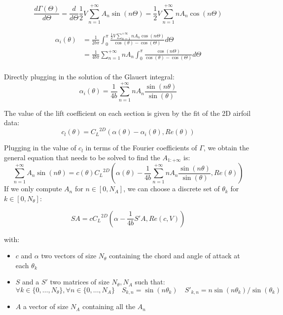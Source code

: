 \documentclass[letterpaper,12pt]{article}
\begin{document}
$$\frac{d\Gamma(\Theta)}{d\Theta} = \frac{d}{d\Theta}\frac12 V\sum_{n=1}^{+\infty} A_n \sin(n\Theta)  = \frac{1}{2} V\sum_{n=1}^{+\infty} n A_n \cos(n\Theta) $$

\begin{align*}
	\alpha_i(\theta) &= \frac{1}{2b\pi }  \int_{0}^{\pi} \frac{ \frac{1}{2} V\sum_{n=1}^{+\infty} n A_n \cos(n\Theta) }{\cos(\theta)-\cos(\Theta)} d\Theta	\\
				&= \frac{1}{4b\pi }  \sum_{n=1}^{+\infty} n A_n \int_{0}^{\pi} \frac{ \cos(n\Theta) }{\cos(\theta)-\cos(\Theta)} d\Theta	\\
\end{align*}

Directly plugging in the solution of the Glauert integral:
$$ \alpha_i(\theta) = \frac {1}{4b}  \sum_{n=1}^{+\infty} n A_n \frac{ \sin(n\theta) }{\sin(\theta)} 	$$

The value of the lift coefficient on each section is given by the fit of the 2D airfoil data:
$$c_l(\theta) = {C_L}^{2D} \left( \alpha(\theta) - \alpha_i(\theta), Re(\theta)\right)$$

Plugging in the value of $c_l$ in terms of the Fourier coefficients of $\Gamma$,
we obtain the general equation that needs to be solved to find the $A_{1:+\infty}$ is:
%
$$
\sum_{n=1}^{+\infty} A_n \sin(n\theta) = c(\theta) {C_L}^{2D} \left( \alpha(\theta) - \frac {1}{4b}  \sum_{n=1}^{+\infty} n A_n \frac{ \sin(n\theta) }{\sin(\theta)} , Re(\theta)\right)
$$
%
If we only compute $A_{n}$ for $n \in [0, N_A]$, we can choose a discrete set of $\theta_k$ for $k \in [0, N_{\theta}]$:

\begin{equation}
	SA = c {C_L}^{2D} \left( \alpha - \frac {1}{4b} S' A , Re(c, V)\right) 
\end{equation}

with:
\begin{itemize}
	\item[] $c$ and $\alpha$ two vectors of size $N_{\theta}$ containing the chord and angle of attack at each $\theta_k$
	\item[] $S$ and a $S'$ two matrices of size $N_{\theta}, N_A$ such that: 
	$$ \forall k\in \{0,\dots, N_{\theta}\}, \forall n \in \{0,\dots, N_A\} \quad S_{k,n} = \sin(n\theta_k) \quad {S'}_{k,n} = n\sin(n\theta_k)/\sin(\theta_k)$$
	\item[] $A$ a vector of size $N_A$ containing all the $A_n$
\end{itemize}
\end{document}
